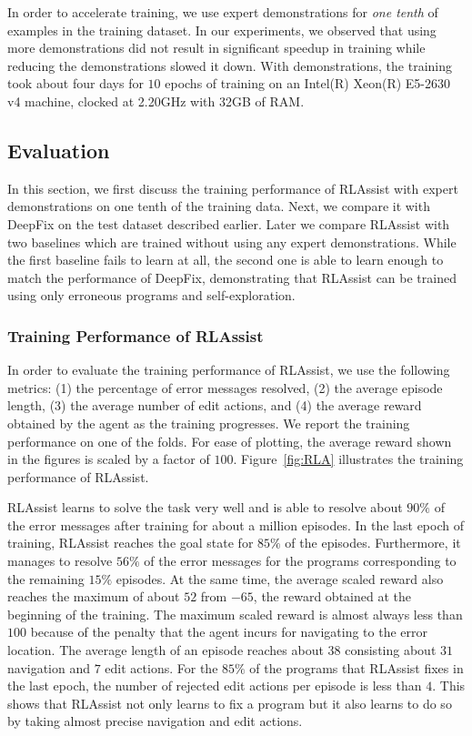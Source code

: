 \documentclass{article}
\begin{document}
In order to accelerate training, we use expert demonstrations for \emph{one tenth} of examples in the training dataset.
In our experiments, we observed that using more demonstrations did not result in significant speedup in training while reducing the demonstrations slowed it down.
With demonstrations, the training took about four days for $10$ epochs of training on an Intel(R) Xeon(R) E5-2630 v4 machine, clocked at 2.20GHz with 32GB of RAM.


\subsection{Evaluation}

In this section, we first discuss the training performance of RLAssist with expert demonstrations on one tenth of the training data. Next, we compare it with DeepFix on the test dataset described earlier. Later we compare RLAssist with two baselines which are trained without using any expert demonstrations. While the first baseline fails to learn at all, the second one is able to learn enough to match the performance of DeepFix, demonstrating that RLAssist can be trained using only erroneous programs and self-exploration.

\subsubsection{Training Performance of RLAssist}
In order to evaluate the training performance of RLAssist, we use the following metrics: (1) the percentage of error messages resolved, (2) the average episode length, (3) the average number of edit actions, and (4) the average reward obtained by the agent as the training progresses.
We report the training performance on one of the folds.
For ease of plotting, the average reward shown in the figures is scaled by a factor of $ 100 $.
Figure~\ref{fig:RLA} illustrates the training performance of RLAssist.

RLAssist learns to solve the task very well and is able to resolve about $ 90\% $ of the error messages after training for about a million episodes.
In the last epoch of training, RLAssist reaches the goal state for $ 85\% $ of the episodes.
Furthermore, it manages to resolve $ 56\% $ of the error messages for the programs corresponding to the remaining $ 15\% $ episodes.
At the same time, the average scaled reward also reaches the maximum of about $ 52 $ from $ -65 $, the reward obtained at the beginning of the training.
The maximum scaled reward is almost always less than $ 100 $ because of the penalty that the agent incurs for navigating to the error location.
The average length of an episode reaches about $ 38 $ consisting about $ 31 $ navigation and $ 7 $ edit actions.
For the $ 85\% $ of the programs that RLAssist fixes in the last epoch, the number of rejected edit actions per episode is less than $ 4 $.
This shows that RLAssist not only learns to fix a program but it also learns to do so by taking almost precise navigation and edit actions.
\end{document}
